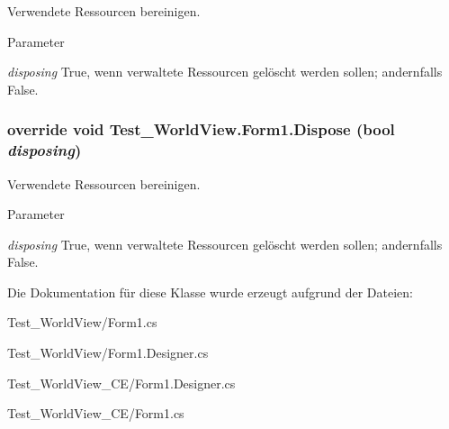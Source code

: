 Verwendete Ressourcen bereinigen. 


\begin{DoxyParams}{Parameter}
\item[{\em disposing}]True, wenn verwaltete Ressourcen gelöscht werden sollen; andernfalls False.\end{DoxyParams}
\hypertarget{class_test___world_view_1_1_form1_aeb423a166a4e2a2273b5b825f12ecc2d}{
\subsubsection[{Dispose}]{\setlength{\rightskip}{0pt plus 5cm}override void Test\_\-WorldView.Form1.Dispose (bool {\em disposing})}}
\label{class_test___world_view_1_1_form1_aeb423a166a4e2a2273b5b825f12ecc2d}


Verwendete Ressourcen bereinigen. 


\begin{DoxyParams}{Parameter}
\item[{\em disposing}]True, wenn verwaltete Ressourcen gelöscht werden sollen; andernfalls False.\end{DoxyParams}


Die Dokumentation für diese Klasse wurde erzeugt aufgrund der Dateien:\begin{DoxyCompactItemize}
\item 
Test\_\-WorldView/Form1.cs\item 
Test\_\-WorldView/Form1.Designer.cs\item 
Test\_\-WorldView\_\-CE/Form1.Designer.cs\item 
Test\_\-WorldView\_\-CE/Form1.cs\end{DoxyCompactItemize}
